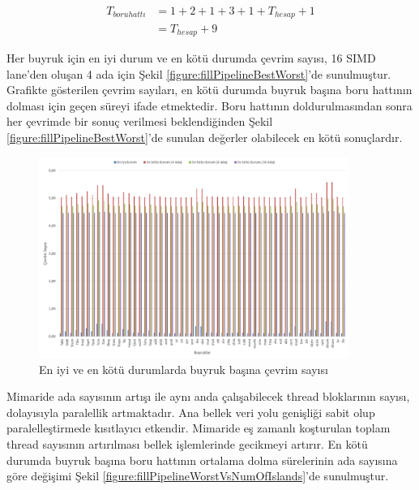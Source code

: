 \begin{align} \label{equation:pipelineCycleEstimationBestCase}
	T_{boru hattı}  &= 1 + 2 + 1 + 3 + 1 + T_{hesap} + 1 \\
									&= T_{hesap} + 9
\end{align}

Her buyruk için en iyi durum ve en kötü durumda çevrim sayısı, 16 SIMD lane'den oluşan 4 ada için Şekil \ref{figure:fillPipelineBestWorst}'de sunulmuştur. Grafikte gösterilen çevrim sayıları, en kötü durumda buyruk başına boru hattının dolması için geçen süreyi ifade etmektedir. Boru hattının doldurulmasından sonra her çevrimde bir sonuç verilmesi beklendiğinden Şekil \ref{figure:fillPipelineBestWorst}'de sunulan değerler olabilecek en kötü sonuçlardır.\par

\begin{figure}[ht] \label{image:fillPipelineBestWorst}
\centering
\shorthandoff{=}
\includegraphics[width=0.9\textwidth]{gorsel/fillPipelineBestWorst.png}
\shorthandoff{=}
\caption{En iyi ve en kötü durumlarda buyruk başına çevrim sayısı}
\end{figure}

Mimaride ada sayısının artışı ile aynı anda çalışabilecek thread bloklarının sayısı, dolayısıyla paralellik artmaktadır. Ana bellek veri yolu genişliği sabit olup paralelleştirmede kısıtlayıcı etkendir. Mimaride eş zamanlı koşturulan toplam thread sayısının artırılması bellek işlemlerinde gecikmeyi artırır. En kötü durumda buyruk başına boru hattının ortalama dolma sürelerinin ada sayısına göre değişimi Şekil \ref{figure:fillPipelineWorstVsNumOfIslands}'de sunulmuştur.\par

